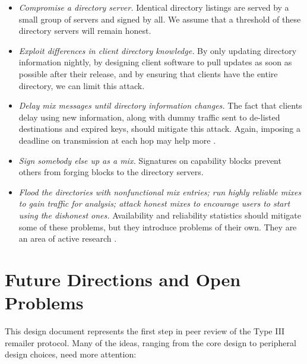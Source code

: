 \documentclass[final,inpress,inline]{ieee}
\begin{document}
\begin{enumerate}
\begin{itemize}
\item \emph{Compromise a directory server.} Identical directory listings
are served by a small group of servers and signed by all. We assume
that a threshold of these directory servers will remain honest.
\item \emph{Exploit differences in client directory knowledge.} By only
updating directory information nightly, by designing client software to
pull updates as soon as possible after their release, and by ensuring
that clients have the entire directory, we can limit this attack.
\item \emph{Delay mix messages until directory information changes.}
The fact that clients delay using new information, along with dummy
traffic sent to de-listed destinations and expired keys, should mitigate
this attack. Again, imposing a deadline on transmission at each hop
may help more \cite{mix-acc}.
\item \emph{Sign somebody else up as a mix.}  Signatures on capability
blocks prevent others from forging blocks to the directory servers.
\item \emph{Flood the directories with nonfunctional mix entries; run
highly reliable mixes to gain traffic for analysis; attack honest mixes
to encourage users to start using the dishonest ones.}
Availability and reliability statistics should mitigate some of these
problems, but they introduce problems of their own. They are an area of
active research \cite{mix-acc}\cite{casc-rep}.
\end{itemize}
\end{enumerate}


\section{Future Directions and Open Problems}
\label{sec:conclusion}

This design document represents the first step in peer review of the
Type III remailer protocol. Many of the ideas, ranging from the core
design to peripheral design choices, need more attention:
\end{document}

